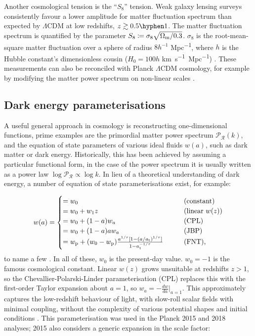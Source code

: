 \documentclass{article}
\begin{document}
Another cosmological tension is the ``$S_8$'' tension. Weak galaxy lensing surveys consistently favour a lower amplitude for matter fluctuation spectrum than expected by $\Lambda$CDM at low redshifts, $z\gtrsim 0.5 \hyphen 1$. The matter fluctuation spectrum is quantified by the parameter $S_8 \coloneqq \sigma_8 \sqrt{\Omega_\textrm m / 0.3}$. $\sigma_8$ is the root-mean-square matter fluctuation over a sphere of radius $8h^{-1}$ \unit{Mpc^{-1}}, where $h$ is the Hubble constant's dimensionless cousin ($H_0=100 h$ \unit{km.s^{-1}.Mpc^{-1}}) \cite{s8-drag}. These measurements can also be reconciled with Planck $\Lambda$CDM cosmology, for example by modifying the matter power spectrum on non-linear scales \cite{Amon-2022}.

\subsection{Dark energy parameterisations}

A useful general approach in cosmology is reconstructing one-dimensional functions, prime examples are the primordial matter power spectrum $\mathcal P_\mathcal R(k)$, and the equation of state parameters of various ideal fluids $w(a)$, such as dark matter or dark energy. Historically, this has been achieved by assuming a particular functional form, in the case of the power spectrum it is usually written as a power law $\log{\mathcal P_\mathcal R} \propto \log{k}$. In lieu of a theoretical understanding of dark energy, a number of equation of state parameterisations exist, for example:

\begin{equation}
  w(a) = 
  \begin{cases}
  = w_0 \qquad & \textrm{(constant)} \\
  = w_0 + w_1 z \qquad & \textrm{(linear } w(z) \textrm{)} \\
  = w_0 + (1-a) w_a \qquad & \textrm{(CPL)}\\
  = w_0 + (1-a)a w_a \qquad & \textrm{(JBP)}\\
  = w_\textrm p + (w_0-w_\textrm p) \frac{a^{1/\tau}[1-(a/a_\textrm t)^{1/\tau}]}{1-a_\textrm t^{-1/\tau}} \qquad & \textrm{(FNT),}\\
  \end{cases}
\end{equation}
%
to name a few \cite{Vazquez_2012}. In all of these, $w_0$ is the present-day value. $w_0=-1$ is the famous cosmological constant. Linear $w(z)$ grows unsuitable at redshifts $z>1$, so the Chevallier-Polarski-Linder parameterisation (CPL) replaces this with the first-order Taylor expansion about $a=1$, so $w_a=-\frac{dw}{da}|_{a=1}$\cite{CPL_1,CPL_2}. This approximately captures the low-redshift behaviour of light, with slow-roll scalar fields with minimal coupling, without the complexity of various potential shapes and initial conditions \cite{planck13xvi}. This parameterisation was used in the Planck 2015 and 2018 analyses; 2015 also considers a generic expansion in the scale factor:
\end{document}
